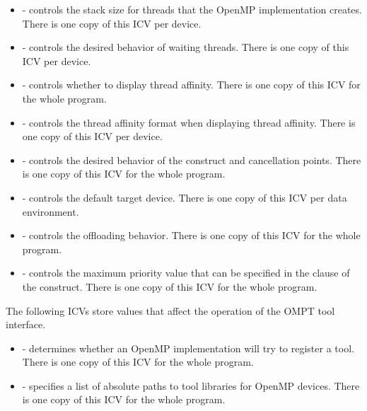 \begin{itemize}
\item {} - controls the stack size for threads that the OpenMP implementation
creates. There is one copy of this ICV per device.

\item {} - controls the desired behavior of waiting threads. There is one copy
of this ICV per device.

\item {} - controls whether to display thread affinity. There is one copy of this ICV for the whole program.

\item {} - controls the thread affinity format when displaying thread affinity. There is one copy of this ICV per device.

\item {} - controls the desired behavior of the  construct and cancellation
points. There is one copy of this ICV for the whole program.

\item {} - controls the default target device. There is one copy of this ICV
per data environment.

\item {} - controls the offloading behavior. There is one copy of this ICV
for the whole program.

\item {} - controls the maximum priority value that can be specified in the
 clause of the  construct. There is one copy of this ICV for the whole program.

\end{itemize}

The following ICVs store values that affect the operation of the
OMPT tool interface.

\begin{itemize}

\item {} - determines whether an OpenMP implementation will
try to register a tool.  There is one copy of this ICV for the whole program.

\item {} - specifies a list of absolute paths to tool libraries for OpenMP devices.
There is one copy of this ICV for the whole program.

\end{itemize}

